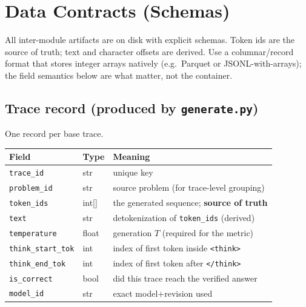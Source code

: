 \documentclass[11pt]{article}
\newcommand{\modu}[1]{\texttt{#1}}
\begin{document}
\section{Data Contracts (Schemas)}
\label{sec:schemas}

All inter-module artifacts are on disk with explicit schemas. Token ids are the source of truth; text and character offsets are derived. Use a columnar/record format that stores integer arrays natively (e.g.\ Parquet or JSONL-with-arrays); the field semantics below are what matter, not the container.

\subsection{Trace record (produced by \modu{generate.py})}
One record per base trace.
\begin{center}
\begin{tabular}{@{}l l p{}@{}}
\toprule
\textbf{Field} & \textbf{Type} & \textbf{Meaning} \\
\midrule
\texttt{trace\_id}        & str           & unique key \\
\texttt{problem\_id}      & str           & source problem (for trace-level grouping) \\
\texttt{token\_ids}       & int[]         & the generated sequence; \textbf{source of truth} \\
\texttt{text}             & str           & detokenization of \texttt{token\_ids} (derived) \\
\texttt{temperature}      & float         & generation $T$ (required for the metric) \\
\texttt{think\_start\_tok}& int           & index of first token inside \texttt{<think>} \\
\texttt{think\_end\_tok}  & int           & index of first token after \texttt{</think>} \\
\texttt{is\_correct}      & bool          & did this trace reach the verified answer \\
\texttt{model\_id}        & str           & exact model+revision used \\
\bottomrule
\end{tabular}
\end{center}
\end{document}
